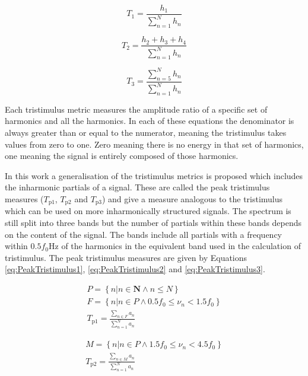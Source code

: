 			\begin{equation}
				T_{1} = \frac{h_{1}}{\sum_{n = 1}^{N} h_{n}}
				\label{eq:Tristimulus1}
			\end{equation}

			\begin{equation}
				T_{2} = \frac{h_{2} + h_{3} + h_{4}}{\sum_{n = 1}^{N} h_{n}}
				\label{eq:Tristimulus2}
			\end{equation}

			\begin{equation}
				T_{3} = \frac{\sum_{n = 5}^{N} h_{n}}{\sum_{n = 1}^{N} h_{n}}
				\label{eq:Tristimulus3}
			\end{equation}

			Each tristimulus metric measures the amplitude ratio of a specific set of harmonics and all the
			harmonics. In each of these equations the denominator is always greater than or equal to the
			numerator, meaning the tristimulus takes values from zero to one. Zero meaning there is no energy
			in that set of harmonics, one meaning the signal is entirely composed of those harmonics.

			In this work a generalisation of the tristimulus metrics is proposed which includes the inharmonic
			partials of a signal. These are called the peak tristimulus measures ($T_{\mathrm{p}1}$,
			$T_{\mathrm{p}2}$ and $T_{\mathrm{p}3}$) and give a measure analogous to the tristimulus which can
			be used on more inharmonically structured signals. The spectrum is still split into three bands but
			the number of partials within these bands depends on the content of the signal. The bands include
			all partials with a frequency within $0.5f_{0}$Hz of the harmonics in the equivalent band used in
			the calculation of tristimulus.  The peak tristimulus measures are given by Equations
			\ref{eq:PeakTristimulus1}, \ref{eq:PeakTristimulus2} and \ref{eq:PeakTristimulus3}.

			\begin{gather}
				P = \left\{ n | n \in \textbf{N} \land n \leq N \right\} \nonumber \\
				F = \left\{ n | n \in P \land 0.5f_{0} \leq \nu_{n} < 1.5f_{0} \right\} \nonumber \\
				T_{\mathrm{p}1} = \frac{\sum_{n \in F} a_{n}}{\sum_{n = 1}^{N} a_{n}}
				\label{eq:PeakTristimulus1}
			\end{gather}

			\begin{gather}
				M = \left\{ n | n \in P \land 1.5f_{0} \leq \nu_{n} < 4.5f_{0} \right\} \nonumber \\
				T_{\mathrm{p}2} = \frac{\sum_{n \in M} a_{n}}{\sum_{n = 1}^{N} a_{n}}
				\label{eq:PeakTristimulus2}
			\end{gather}

